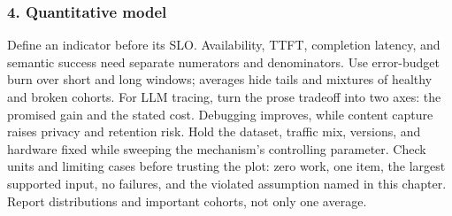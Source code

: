 \subsubsection*{4. Quantitative model}
Define an indicator before its SLO. Availability, TTFT, completion latency, and semantic success need separate numerators and denominators. Use error-budget burn over short and long windows; averages hide tails and mixtures of healthy and broken cohorts.
For LLM tracing, turn the prose tradeoff into two axes: the promised gain and the stated cost. Debugging improves, while content capture raises privacy and retention risk. Hold the dataset, traffic mix, versions, and hardware fixed while sweeping the mechanism's controlling parameter.
Check units and limiting cases before trusting the plot: zero work, one item, the largest supported input, no failures, and the violated assumption named in this chapter. Report distributions and important cohorts, not only one average.

